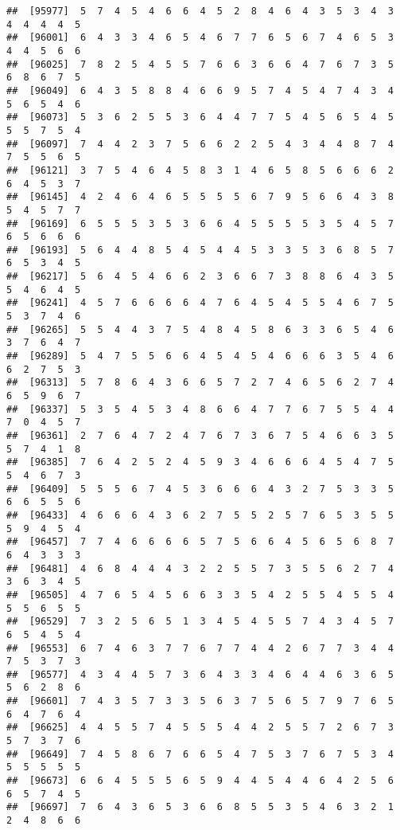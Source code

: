 \documentclass[
]{book}
\begin{document}
\begin{verbatim}
##  [95977]  5  7  4  5  4  6  6  4  5  2  8  4  6  4  3  5  3  4  3  4  4  4  4  5
##  [96001]  6  4  3  3  4  6  5  4  6  7  7  6  5  6  7  4  6  5  3  4  4  5  6  6
##  [96025]  7  8  2  5  4  5  5  7  6  6  3  6  6  4  7  6  7  3  5  6  8  6  7  5
##  [96049]  6  4  3  5  8  8  4  6  6  9  5  7  4  5  4  7  4  3  4  5  6  5  4  6
##  [96073]  5  3  6  2  5  5  3  6  4  4  7  7  5  4  5  6  5  4  5  5  5  7  5  4
##  [96097]  7  4  4  2  3  7  5  6  6  2  2  5  4  3  4  4  8  7  4  7  5  5  6  5
##  [96121]  3  7  5  4  6  4  5  8  3  1  4  6  5  8  5  6  6  6  2  6  4  5  3  7
##  [96145]  4  2  4  6  4  6  5  5  5  5  6  7  9  5  6  6  4  3  8  5  4  5  7  7
##  [96169]  6  5  5  5  3  5  3  6  6  4  5  5  5  5  3  5  4  5  7  6  5  6  6  6
##  [96193]  5  6  4  4  8  5  4  5  4  4  5  3  3  5  3  6  8  5  7  6  5  3  4  5
##  [96217]  5  6  4  5  4  6  6  2  3  6  6  7  3  8  8  6  4  3  5  5  4  6  4  5
##  [96241]  4  5  7  6  6  6  6  4  7  6  4  5  4  5  5  4  6  7  5  5  3  7  4  6
##  [96265]  5  5  4  4  3  7  5  4  8  4  5  8  6  3  3  6  5  4  6  3  7  6  4  7
##  [96289]  5  4  7  5  5  6  6  4  5  4  5  4  6  6  6  3  5  4  6  6  2  7  5  3
##  [96313]  5  7  8  6  4  3  6  6  5  7  2  7  4  6  5  6  2  7  4  6  5  9  6  7
##  [96337]  5  3  5  4  5  3  4  8  6  6  4  7  7  6  7  5  5  4  4  7  0  4  5  7
##  [96361]  2  7  6  4  7  2  4  7  6  7  3  6  7  5  4  6  6  3  5  5  7  4  1  8
##  [96385]  7  6  4  2  5  2  4  5  9  3  4  6  6  6  4  5  4  7  5  5  4  6  7  3
##  [96409]  5  5  5  6  7  4  5  3  6  6  6  4  3  2  7  5  3  3  5  6  6  5  5  6
##  [96433]  4  6  6  6  4  3  6  2  7  5  5  2  5  7  6  5  3  5  5  5  9  4  5  4
##  [96457]  7  7  4  6  6  6  6  5  7  5  6  6  4  5  6  5  6  8  7  6  4  3  3  3
##  [96481]  4  6  8  4  4  4  3  2  2  5  5  7  3  5  5  6  2  7  4  3  6  3  4  5
##  [96505]  4  7  6  5  4  5  6  6  3  3  5  4  2  5  5  4  5  5  4  5  5  6  5  5
##  [96529]  7  3  2  5  6  5  1  3  4  5  4  5  5  7  4  3  4  5  7  6  5  4  5  4
##  [96553]  6  7  4  6  3  7  7  6  7  7  4  4  2  6  7  7  3  4  4  7  5  3  7  3
##  [96577]  4  3  4  4  5  7  3  6  4  3  3  4  6  4  4  6  3  6  5  5  6  2  8  6
##  [96601]  7  4  3  5  7  3  3  5  6  3  7  5  6  5  7  9  7  6  5  6  4  7  6  4
##  [96625]  4  4  5  5  7  4  5  5  5  4  4  2  5  5  7  2  6  7  3  5  7  3  7  6
##  [96649]  7  4  5  8  6  7  6  6  5  4  7  5  3  7  6  7  5  3  4  5  5  5  5  5
##  [96673]  6  6  4  5  5  5  6  5  9  4  4  5  4  4  6  4  2  5  6  6  5  7  4  5
##  [96697]  7  6  4  3  6  5  3  6  6  8  5  5  3  5  4  6  3  2  1  2  4  8  6  6

\end{verbatim}
\end{document}
